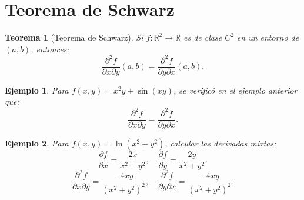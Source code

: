 \documentclass[11pt]{book}
\theoremstyle{definicion}
\theoremstyle{teorema}
\newtheorem{teorema}{Teorema}[section]
\theoremstyle{ejemplo}
\newtheorem{ejemplo}{Ejemplo}[section]
\begin{document}
\section{Teorema de Schwarz}

\begin{teorema}[Teorema de Schwarz]
    Si \( f: \mathbb{R}^2 \to \mathbb{R} \) es de clase \( C^2 \) en un entorno de \( (a, b) \), entonces:
    \[
    \frac{\partial^2 f}{\partial x \partial y}(a, b) = \frac{\partial^2 f}{\partial y \partial x}(a, b).
    \]
\end{teorema}

\begin{ejemplo}
    Para \( f(x, y) = x^2 y + \sin(xy) \), se verificó en el ejemplo anterior que:
    \[
    \frac{\partial^2 f}{\partial x \partial y} = \frac{\partial^2 f}{\partial y \partial x}.
    \]
\end{ejemplo}

\begin{ejemplo}
    Para \( f(x, y) = \ln(x^2 + y^2) \), calcular las derivadas mixtas:
    \[
    \frac{\partial f}{\partial x} = \frac{2x}{x^2 + y^2}, \quad \frac{\partial f}{\partial y} = \frac{2y}{x^2 + y^2}.
    \]
    \[
    \frac{\partial^2 f}{\partial x \partial y} = \frac{-4xy}{(x^2 + y^2)^2}, \quad \frac{\partial^2 f}{\partial y \partial x} = \frac{-4xy}{(x^2 + y^2)^2}.
    \]
\end{ejemplo}
\end{document}
